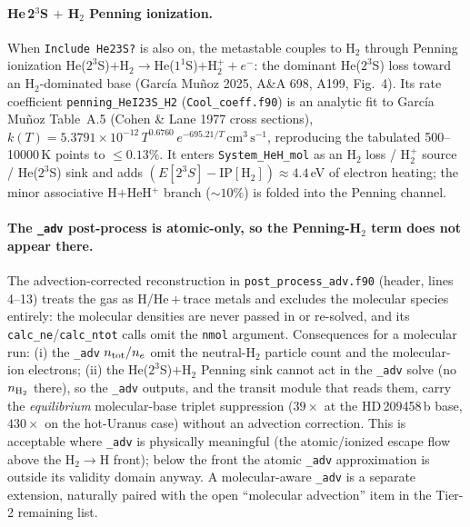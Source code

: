 \documentclass[english,a4paper]{my_memo}
\begin{document}
\paragraph{He\,2$^3$S $+$ H$_2$ Penning ionization.} When \texttt{Include
He23S?} is also on, the metastable couples to H$_2$ through Penning ionization
He($2^3$S)$+$H$_2\to$He($1^1$S)$+$H$_2^+ + e^-$: the dominant He($2^3$S) loss
toward an H$_2$-dominated base (Garc\'ia Mu\~noz 2025, A\&A 698, A199, Fig.~4).
Its rate coefficient \texttt{penning\_HeI23S\_H2} (\texttt{Cool\_coeff.f90}) is
an analytic fit to Garc\'ia Mu\~noz Table~A.5 (Cohen \& Lane 1977 cross
sections), $k(T)=5.3791\times10^{-12}\,T^{0.6760}\,e^{-695.21/T}\,
\mathrm{cm^3\,s^{-1}}$, reproducing the tabulated 500--10000\,K points to
$\le0.13\%$. It enters \texttt{System\_HeH\_mol} as an H$_2$ loss / H$_2^+$
source / He($2^3$S) sink and adds $(E[2^3S]-\mathrm{IP}[\mathrm{H_2}])\approx
4.4\,$eV of electron heating; the minor associative H$+$HeH$^+$ branch
(${\sim}10\%$) is folded into the Penning channel.

\paragraph{The \texttt{\_adv} post-process is atomic-only, so the Penning-H$_2$
term does not appear there.} The advection-corrected reconstruction in
\texttt{post\_process\_adv.f90} (header, lines 4--13) treats the gas as
H/He\,$+$\,trace metals and excludes the molecular species entirely: the
molecular densities are never passed in or re-solved, and its
\texttt{calc\_ne}/\texttt{calc\_ntot} calls omit the \texttt{nmol} argument.
Consequences for a molecular run: (i) the \texttt{\_adv} $n_{\rm tot}/n_e$ omit
the neutral-H$_2$ particle count and the molecular-ion electrons; (ii) the
He($2^3$S)$+$H$_2$ Penning sink cannot act in the \texttt{\_adv} solve (no
$n_{\rm H_2}$ there), so the \texttt{\_adv} outputs, and the transit module
that reads them, carry the \emph{equilibrium} molecular-base triplet
suppression ($39\times$ at the HD\,209458\,b base, $430\times$ on the
hot-Uranus case) without an advection correction. This is acceptable where
\texttt{\_adv} is physically meaningful (the atomic/ionized escape flow above
the H$_2\to$H front); below the front the atomic \texttt{\_adv} approximation
is outside its validity domain anyway. A molecular-aware \texttt{\_adv} is a
separate extension, naturally paired with the open ``molecular advection''
item in the Tier-2 remaining list.
\end{document}
